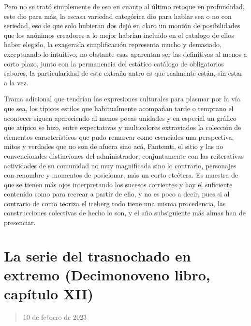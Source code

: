 \documentclass[
]{book}
\begin{document}
Pero no se trató simplemente de eso en cuanto al último retoque en profundidad, este dio para más, la escasa variedad categórica dio para hablar sea o no con seriedad, eso de que solo hubieran dos dejó en claro un montón de posibilidades que los anónimos creadores a lo mejor habrían incluido en el catalogo de ellos haber elegido, la exagerada simplificación representa mucho y demasiado, exceptuando lo intuitivo, no obstante esas aparentan ser las definitivas al menos a corto plazo, junto con la permanencia del estático catálogo de obligatorios sabores, la particularidad de este extraño antro es que realmente están, sin estar a la vez.

Trama adicional que tendrían las expresiones culturales para plasmar por la vía que sea, los típicos estilos que habitualmente acompañan tarde o temprano el acontecer siguen apareciendo al menos pocas unidades y en especial un gráfico que atípico se hizo, entre expectativas y multicolores extraviados la colección de elementos característicos que pudo remarcar como esenciales una perspectiva, mitos y verdades que no son de afuera sino acá, Fantemti, el sitio y las no convencionales distinciones del administrador, conjuntamente con las reiterativas actividades de su comunidad no muy magnificada sino lo contrario, personajes con renombre y momentos de posicionar, más un corto etcétera. Es muestra de que se tienen más ojos interpretando los sucesos corrientes y hay el suficiente contenido como para recrear a partir de ello, y no es poco a decir, pues si al contrario de como teoriza el iceberg todo tiene una misma procedencia, las construcciones colectivas de hecho lo son, y el año subsiguiente más almas han de presenciar.

\hypertarget{la-serie-del-trasnochado-en-extremo-decimonoveno-libro-capuxedtulo-xii}{%
\section{La serie del trasnochado en extremo (Decimonoveno libro, capítulo XII)}\label{la-serie-del-trasnochado-en-extremo-decimonoveno-libro-capuxedtulo-xii}}

\begin{quote}
10 de febrero de 2023
\end{quote}
\end{document}
